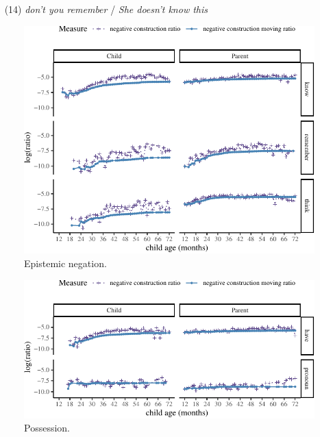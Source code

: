 \documentclass[10pt, letterpaper]{article}
\newenvironment{CodeChunk}{}{}
\begin{document}
~ (14) \emph{don't you remember} / \emph{She doesn't know this}

\begin{figure}[h!]

\begin{CodeChunk}


\begin{center}\includegraphics{figs/epistemic-1} \end{center}

\end{CodeChunk}
\caption[This image spans both columns]{Epistemic negation.}\label{fig:epistemic}
\end{figure}

\begin{figure}[h!]

\begin{CodeChunk}


\begin{center}\includegraphics{figs/possession-1} \end{center}

\end{CodeChunk}
\caption[This image spans both columns]{Possession.}\label{fig:possession}
\end{figure}
\end{document}
